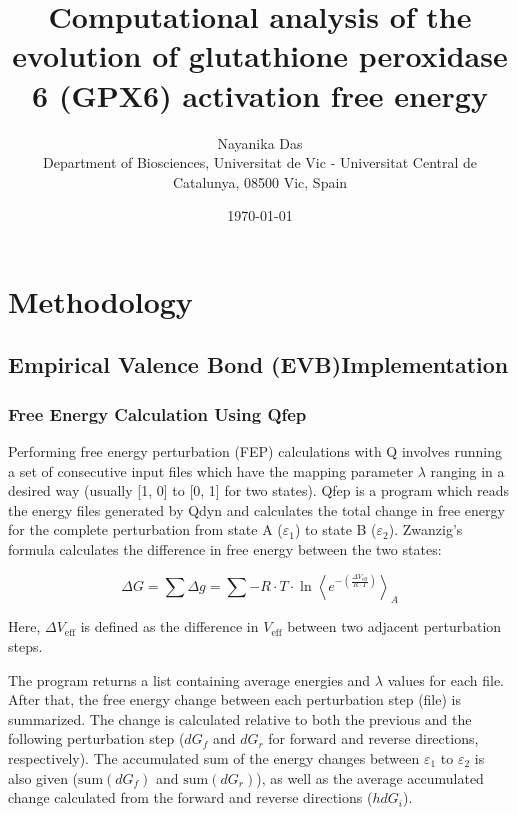 \documentclass{article}
\title{Computational analysis of the evolution of glutathione peroxidase 6 (GPX6) activation free energy}
\author{Nayanika Das \\ Department of Biosciences, Universitat de Vic - Universitat Central de Catalunya, 08500 Vic, Spain}
\date{\today}
\begin{document}
\maketitle

\section{Methodology}

\subsection{Empirical Valence Bond (EVB)Implementation}

\subsubsection{Free Energy Calculation Using Qfep}

Performing free energy perturbation (FEP) calculations with Q involves running a set of consecutive input files which have the mapping parameter $\lambda$ ranging in a desired way (usually [1, 0] to [0, 1] for two states). Qfep is a program which reads the energy files generated by Qdyn and calculates the total change in free energy for the complete perturbation from state A ($\varepsilon_1$) to state B ($\varepsilon_2$). Zwanzig’s formula calculates the difference in free energy between the two states:

\begin{equation}
    \Delta G = \sum \Delta g = \sum -R \cdot T \cdot \ln \left\langle e^{-\left(\frac{\Delta V_{\text{eff}}}{R \cdot T}\right)} \right\rangle_{A}
\end{equation}

Here, \(\Delta V_{\text{eff}}\) is defined as the difference in \( V_{\text{eff}} \) between two adjacent perturbation steps. 

The program returns a list containing average energies and \(\lambda\) values for each file. After that, the free energy change between each perturbation step (file) is summarized. The change is calculated relative to both the previous and the following perturbation step (\(dG_f\) and \(dG_r\) for forward and reverse directions, respectively). The accumulated sum of the energy changes between \(\varepsilon_1\) to \(\varepsilon_2\) is also given (\(\text{sum}(dG_f)\) and \(\text{sum}(dG_r)\)), as well as the average accumulated change calculated from the forward and reverse directions (\(h dG_i\)).
\end{document}
